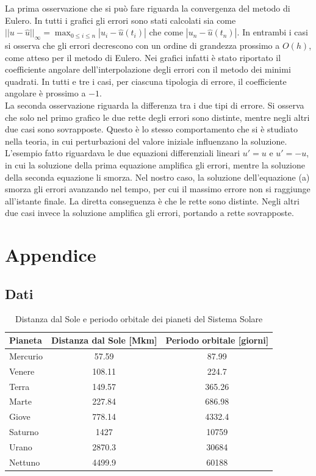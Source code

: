 \documentclass[letterpaper, 12pt]{article}
\begin{document}
La prima osservazione che si può fare riguarda la convergenza del metodo di Eulero. In tutti i grafici
gli errori sono stati calcolati sia come $||u-\hat{u}||_\infty=\max_{0\leq i\leq n} |u_i-\hat{u}(t_i)|$ che come
$|u_n-\hat{u}(t_n)|$. In entrambi i casi si osserva che gli errori decrescono con un ordine di grandezza
prossimo a $O(h)$, come atteso per il metodo di Eulero. Nei grafici infatti è stato riportato il coefficiente
angolare dell'interpolazione degli errori con il metodo dei minimi quadrati. In tutti e tre i casi, per ciascuna
tipologia di errore, il coefficiente angolare è prossimo a $-1$. \\
La seconda osservazione riguarda la differenza tra i due tipi di errore. Si osserva che solo nel primo grafico 
le due rette degli errori sono distinte, mentre negli altri due casi sono sovrapposte. Questo è lo stesso 
comportamento che si è studiato nella teoria, in cui perturbazioni del valore iniziale influenzano la soluzione.
L'esempio fatto riguardava le due equazioni differenziali lineari $u' = u$ e $u' = -u $, in cui la soluzione
della prima equazione amplifica gli errori, mentre la soluzione della seconda equazione li smorza. 
Nel nostro caso, la soluzione dell'equazione (a) smorza gli errori avanzando nel tempo, per cui il massimo 
errore non si raggiunge all'istante finale. La diretta conseguenza è che le rette sono distinte.
Negli altri due casi invece la soluzione amplifica gli errori, portando a rette sovrapposte.


\section{Appendice}
\subsection{Dati}

\begin{table}[!ht]
    \centering
    \caption{Distanza dal Sole e periodo orbitale dei pianeti del Sistema Solare}
    \label{tab:pianeti}
        \begin{tabular}{|l|c|c|}
        \hline
        \textbf{Pianeta} & \textbf{Distanza dal Sole [Mkm]} & \textbf{Periodo orbitale [giorni]} \\
        \hline
        Mercurio & 57.59   & 87.99   \\
        Venere   & 108.11  & 224.7   \\
        Terra    & 149.57  & 365.26  \\
        Marte    & 227.84  & 686.98  \\
        Giove    & 778.14  & 4332.4  \\
        Saturno  & 1427    & 10759   \\
        Urano    & 2870.3  & 30684   \\
        Nettuno  & 4499.9  & 60188   \\
        \hline
        \end{tabular}
\end{table}
\end{document}
